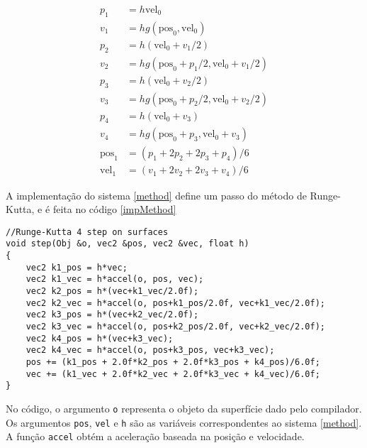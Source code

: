 \begin{equation}
\label{method}
\begin{split}
    p_1 & = h\text{vel}_0 \\
    v_1 & = hg(\text{pos}_0, \text{vel}_0) \\
    p_2 & = h(\text{vel}_0+v_1/2) \\
    v_2 & = hg(\text{pos}_0+p_1/2, \text{vel}_0+v_1/2) \\
    p_3 & = h(\text{vel}_0+v_2/2) \\
    v_3 & = hg(\text{pos}_0+p_2/2, \text{vel}_0+v_2/2) \\
    p_4 & = h(\text{vel}_0+v_3) \\
    v_4 & = hg(\text{pos}_0+p_3, \text{vel}_0+v_3) \\
    \text{pos}_1 & = (p_1+2p_2+2p_3+p_4)/6 \\
    \text{vel}_1 & = (v_1+2v_2+2v_3+v_4)/6
\end{split}
\end{equation}

A implementação do sistema \ref{method} define um passo do método de Runge-Kutta,
e é feita no código \ref{impMethod}

\begin{lstlisting}[caption=Implementação do método de Runge-Kutta, label=impMethod]
//Runge-Kutta 4 step on surfaces
void step(Obj &o, vec2 &pos, vec2 &vec, float h)
{
    vec2 k1_pos = h*vec;
    vec2 k1_vec = h*accel(o, pos, vec);
    vec2 k2_pos = h*(vec+k1_vec/2.0f);
    vec2 k2_vec = h*accel(o, pos+k1_pos/2.0f, vec+k1_vec/2.0f);
    vec2 k3_pos = h*(vec+k2_vec/2.0f);
    vec2 k3_vec = h*accel(o, pos+k2_pos/2.0f, vec+k2_vec/2.0f);
    vec2 k4_pos = h*(vec+k3_vec);
    vec2 k4_vec = h*accel(o, pos+k3_pos, vec+k3_vec);
    pos += (k1_pos + 2.0f*k2_pos + 2.0f*k3_pos + k4_pos)/6.0f;
    vec += (k1_vec + 2.0f*k2_vec + 2.0f*k3_vec + k4_vec)/6.0f;
}
\end{lstlisting}

No código, o argumento \texttt{o} representa o objeto da superfície dado pelo compilador.
Os argumentos \texttt{pos}, \texttt{vel} e \texttt{h} são as variáveis correspondentes ao sistema \ref{method}.
A função \texttt{accel} obtém a aceleração baseada na posição e velocidade.
